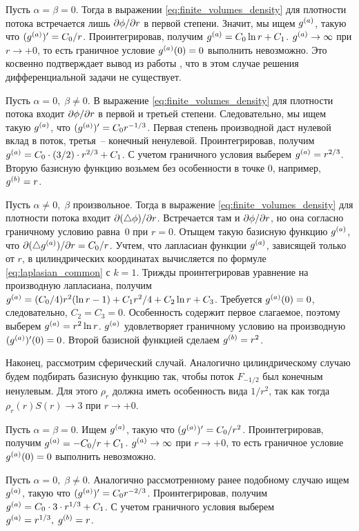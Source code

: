Пусть $\alpha = \beta = 0$. Тогда в выражении \eqref{eq:finite_volumes_density} для плотности потока встречается лишь $\partial \phi / \partial r$ в первой степени. Значит, мы ищем ${g^{(a)}}$, такую что $(\ga)' \hm = C_0/r$. Проинтегрировав, получим ${g^{(a)}} = C_0 \ln r + C_1$. ${g^{(a)}} \to \infty$ при $r \to +0$, то есть граничное условие ${g^{(a)}}(0) = 0$ выполнить невозможно. Это косвенно подтверждает вывод из работы \cite{zipunova_higher_codimension}, что в этом случае решения дифференциальной задачи не существует.

Пусть $\alpha = 0, \; \beta \neq 0$. В выражение \eqref{eq:finite_volumes_density} для плотности потока входит $\partial \phi / \partial r$ в первой и третьей степени. Следовательно, мы ищем такую ${g^{(a)}}$, что $(\ga)' \hm = C_0 r^{-1/3}$. Первая степень производной даст нулевой вклад в поток, третья~-- конечный ненулевой. Проинтегрировав, получим ${g^{(a)}} = C_0 \cdot (3/2) \cdot r^{2/3} + C_1$. С учетом граничного условия выберем ${g^{(a)}} = r^{2/3}$. Вторую базисную функцию возьмем без особенности в точке $0$, например, ${g^{(b)}} = r$.

Пусть $\alpha \neq 0, \; \beta$ произвольное. Тогда в выражение \eqref{eq:finite_volumes_density} для плотности потока входит $\partial (\triangle \phi) / \partial r$. Встречается там и $\partial \phi / \partial r$, но она согласно граничному условию равна~$0$ при $r = 0$. Отыщем такую базисную функцию ${g^{(a)}}$, что $\partial (\triangle {g^{(a)}}) / \partial r = C_0 / r$. Учтем, что лапласиан функции ${g^{(a)}}$, зависящей только от $r$, в цилиндрических координатах вычисляется по формуле \eqref{eq:laplasian_common} с $k = 1$. Трижды проинтегрировав уравнение на производную лапласиана, получим ${g^{(a)}} = (C_0/4) r^2 (\ln r - 1) + C_1 r^2 / 4 + C_2 \ln r + C_3$. Требуется ${g^{(a)}}(0) = 0$, следовательно, $C_2 = C_3 = 0$. Особенность содержит первое слагаемое, поэтому выберем ${g^{(a)}} = r^2 \ln r$. ${g^{(a)}}$ удовлетворяет граничному условию на производную $({g^{(a)}})'(0) = 0$. Второй базисной функцией сделаем ${g^{(b)}} = r^2$.

Наконец, рассмотрим сферический случай. Аналогично цилиндрическому случаю будем подбирать базисную функцию так, чтобы поток $F_{-1/2}$ был конечным ненулевым. Для этого $\rho_r$ должна иметь особенность вида $1/r^2$, так как тогда $\rho_r(r) S(r) \to 3$ при $r \to +0$.

Пусть $\alpha = \beta = 0$. Ищем ${g^{(a)}}$, такую что $({g^{(a)}})' = C_0 / r^2$. Проинтегрировав, получим ${g^{(a)}} = -C_0 / r + C_1$. ${g^{(a)}} \to \infty$ при $r \to +0$, то есть граничное условие ${g^{(a)}}(0) = 0$ выполнить невозможно.

Пусть $\alpha = 0, \; \beta \neq 0$. Аналогично рассмотренному ранее подобному случаю ищем ${g^{(a)}}$, такую что $({g^{(a)}})' = C_0 r^{-2/3}$. Проинтегрировав, получим $\ga \hm = C_0 \cdot 3 \cdot r^{1/3} + C_1$. С учетом граничного условия выберем ${g^{(a)}} = r^{1/3}, \; {g^{(b)}} = r$.

